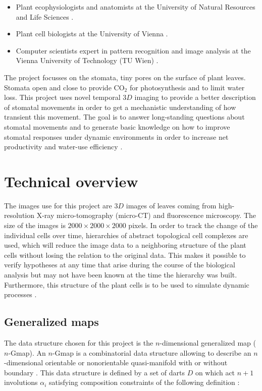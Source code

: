 \begin{itemize}
    \item Plant ecophysiologists and anatomists at the University of Natural Resources 
    and Life Sciences \cite{BOKU}.
    \item Plant cell biologists at the University of Vienna \cite{UVI}.
    \item Computer scientists expert in pattern recognition and image analysis at the 
    Vienna University of Technology (TU Wien) \cite{TUV}.
\end{itemize}
%
The project focusses on the stomata, tiny pores on the surface of plant leaves. 
Stomata open and close to provide $\mathrm{CO_2}$ for photosynthesis and to limit 
water loss. This project uses novel temporal $3D$ imaging to provide a better description 
of stomatal movements in order to get a mechanistic understanding of how transient 
this movement. The goal is to answer long-standing questions about stomatal movements 
and to generate basic knowledge on how to improve stomatal responses under dynamic 
environments in order to increase net productivity and water-use efficiency \cite{WGH}.
         
\section{Technical overview}

The images use for this project are $3D$ images of leaves coming from high-resolution 
X-ray micro-tomography (micro-CT) and fluorescence microscopy. The size of the images is
$2000 \times 2000 \times 2000$ pixels. In order to track the change of the individual 
cells over time, hierarchies of abstract topological cell complexes are used, which will
reduce the image data to a neighboring structure of the plant cells without losing the
relation to the original data. This makes it possible to verify hypotheses at any time
that arise during the course of the biological analysis but may not have been known at
the time the hierarchy was built. Furthermore, this structure of the plant cells is to be
used to simulate dynamic processes \cite{PWGH}.

\subsection{Generalized maps}

The data structure chosen for this project is the $n$-dimensional generalized map
($n$-Gmap). An $n$-Gmap is a combinatorial data structure allowing to describe an
$n$-dimensional orientable or nonorientable quasi-manifold with or without boundary
\cite{Lienhardt}. This data structure is defined by a set of darts $D$ on which act
$n+1$ involutions $\alpha_i$ satisfying composition constraints of the following
definition \cite{Damiand}:

